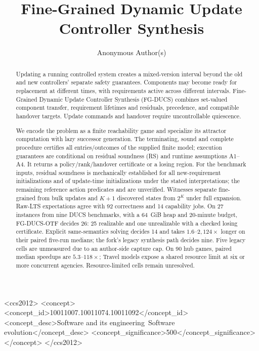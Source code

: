\documentclass[acmsmall,screen,review,anonymous]{acmart}
\begin{document}
\title{Fine-Grained Dynamic Update Controller Synthesis}

\author{Anonymous Author(s)}
\renewcommand{\shortauthors}{Anonymous Author(s)}

\begin{abstract}
Updating a running controlled system creates a mixed-version interval beyond the old and new controllers' separate safety guarantees. Components may become ready for replacement at different times, with requirements active across different intervals. Fine-Grained Dynamic Update Controller Synthesis (FG-DUCS) combines set-valued component transfer, requirement lifetimes and residuals, precedence, and compatible handover targets. Update commands and handover require uncontrollable quiescence.

We encode the problem as a finite reachability game and specialize its attractor computation with lazy successor generation. The terminating, sound and complete procedure certifies all entries/outcomes of the supplied finite model; execution guarantees are conditional on residual soundness (RS) and runtime assumptions A1--A4. It returns a policy/rank/handover certificate or a losing region. For the benchmark inputs, residual soundness is mechanically established for all \RSAExactNew{} new-requirement initializations and \RSEExactUpd{} of \RSUpdOccurrences{} update-time initializations under the stated interpretations; the remaining \RSEUnverifiedUpd{} reference action predicates and are unverified. Witnesses separate fine-grained from bulk updates and $K+1$ discovered states from $2^K$ under full expansion. Raw-LTS expectations agree with 92 correctness and 14 capability jobs. On 27 instances from nine DUCS benchmarks, with a 64~GiB heap and 20-minute budget, FG-DUCS-OTF decides 26: 25 realizable and one unrealizable with a checked losing certificate. Explicit same-semantics solving decides 14 and takes $1.6$--$2{,}124\times$ longer on their paired five-run medians; the fork's legacy synthesis path decides nine. Five legacy cells are unmeasured due to an author-side capture cap. On 90 hub games, paired median speedups are $5.3$--$118\times$; Travel models expose a shared resource limit at six or more concurrent agencies. Resource-limited cells remain unresolved.
\end{abstract}

\begin{CCSXML}
<ccs2012>
 <concept>
  <concept_id>10011007.10011074.10011092</concept_id>
  <concept_desc>Software and its engineering~Software evolution</concept_desc>
  <concept_significance>500</concept_significance>
 </concept>
</ccs2012>
\end{CCSXML}
\end{document}
